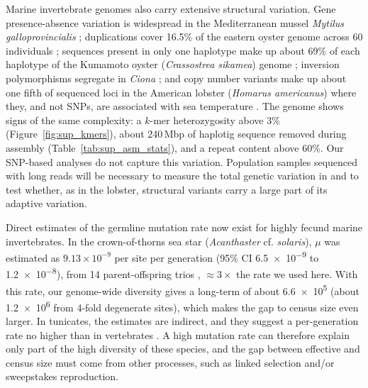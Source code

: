Marine invertebrate genomes also carry extensive structural variation.
Gene presence-absence variation is widespread in the Mediterranean mussel \textit{Mytilus
galloprovincialis} \citep{gerdol_massive_2020};
duplications cover 16.5\% of the eastern oyster genome across 60 individuals \citep{modak_extensive_2021};
sequences present in only one haplotype make up about 69\% of each haplotype of the
Kumamoto oyster (\textit{Crassostrea sikamea}) genome \citep{liu_bivalves_2025};
inversion polymorphisms segregate in \textit{Ciona} \citep{satou_chromosomal_2021};
and copy number variants make up about one fifth of sequenced loci in the American lobster
(\textit{Homarus americanus}) where they, and not SNPs, are associated with sea
temperature \citep{dorant_copy_2020}.
The \bgla{} genome shows signs of the same complexity: a $k$-mer heterozygosity above
3\% (Figure~\ref{fig:sup_kmers}), about 240\,Mbp of haplotig sequence removed during
assembly (Table~\ref{tab:sup_asm_stats}), and a repeat content above 60\%.
Our SNP-based analyses do not capture this variation.
Population samples sequenced with long reads will be necessary to measure the total
genetic variation in \bgla{} and to test whether, as in the lobster, structural
variants carry a large part of its adaptive variation.
\vspace{0.1cm}

Direct estimates of the germline mutation rate now exist
for highly fecund marine invertebrates.
In the crown-of-thorns sea star (\textit{Acanthaster} cf. \textit{solaris}),
$\mu$ was estimated as $9.13 \times 10^{-9}$ per site per generation (95\% CI
\num{6.5e-9} to \num{1.2e-8}), from 14 parent-offspring trios \citep{popovic_high_2024},
$\approx 3 \times$ the rate we used here.
With this rate, our genome-wide diversity gives a long-term \Ne{} of about
\num{6.6e5} (about \num{1.2e6} from 4-fold degenerate sites), which makes the gap to
census size even larger.
In tunicates, the estimates are indirect, and they suggest a per-generation rate no
higher than in vertebrates \citep{tsagkogeorga_population_2012}.
A high mutation rate can therefore explain only part of the high diversity of these
species, and the gap between effective and census size must come from other processes,
such as linked selection and/or sweepstakes reproduction.
